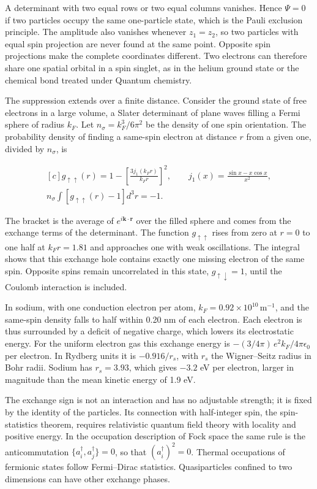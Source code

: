 \documentclass[11pt,oneside]{book}
\newenvironment{centeredalign}{\[\begin{gathered}[c]}{\end{gathered}\]}
\begin{document}
A determinant with two equal rows or two equal columns vanishes. Hence \(\Psi=0\) if two particles occupy the same one-particle state, which is the Pauli exclusion principle. The amplitude also vanishes whenever \(z_1=z_2\), so two particles with equal spin projection are never found at the same point. Opposite spin projections make the complete coordinates different. Two electrons can therefore share one spatial orbital in a spin singlet, as in the helium ground state or the chemical bond treated under Quantum chemistry.

The suppression extends over a finite distance. Consider the ground state of free electrons in a large volume, a Slater determinant of plane waves filling a Fermi sphere of radius \(k_F\). Let \(n_\sigma=k_F^3/6\pi^2\) be the density of one spin orientation. The probability density of finding a same-spin electron at distance \(r\) from a given one, divided by \(n_\sigma\), is

\begin{centeredalign}
g_{\uparrow\uparrow}(r)=1-\left[\frac{3j_1(k_Fr)}{k_Fr}\right]^2,\qquad
j_1(x)=\frac{\sin x-x\cos x}{x^2},\\
n_\sigma\int\left[g_{\uparrow\uparrow}(r)-1\right]d^3r=-1.
\end{centeredalign}

The bracket is the average of \(e^{i\mathbf k\cdot\mathbf r}\) over the filled sphere and comes from the exchange terms of the determinant. The function \(g_{\uparrow\uparrow}\) rises from zero at \(r=0\) to one half at \(k_Fr=1.81\) and approaches one with weak oscillations. The integral shows that this exchange hole contains exactly one missing electron of the same spin. Opposite spins remain uncorrelated in this state, \(g_{\uparrow\downarrow}=1\), until the Coulomb interaction is included.

In sodium, with one conduction electron per atom, \(k_F=0.92\times10^{10}\,\mathrm{m^{-1}}\), and the same-spin density falls to half within 0.20 nm of each electron. Each electron is thus surrounded by a deficit of negative charge, which lowers its electrostatic energy. For the uniform electron gas this exchange energy is \(-(3/4\pi)\,e^2k_F/4\pi\epsilon_0\) per electron. In Rydberg units it is \(-0.916/r_s\), with \(r_s\) the Wigner--Seitz radius in Bohr radii. Sodium has \(r_s=3.93\), which gives \(-3.2\) eV per electron, larger in magnitude than the mean kinetic energy of 1.9 eV.

The exchange sign is not an interaction and has no adjustable strength; it is fixed by the identity of the particles. Its connection with half-integer spin, the spin-statistics theorem, requires relativistic quantum field theory with locality and positive energy. In the occupation description of Fock space the same rule is the anticommutation \(\{a_i^\dagger,a_j^\dagger\}=0\), so that \((a_i^\dagger)^2=0\). Thermal occupations of fermionic states follow Fermi--Dirac statistics. Quasiparticles confined to two dimensions can have other exchange phases.
\end{document}
